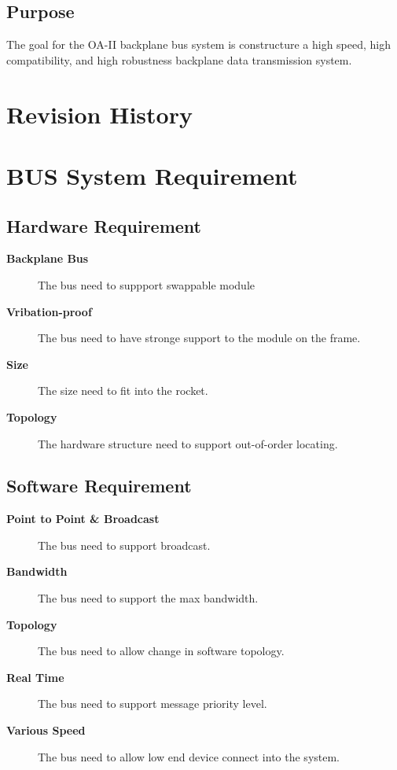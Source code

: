 \documentclass[12pt,article]{memoir}
\begin{document}
\section{Purpose}
The goal for the OA-II backplane bus system is constructure a high speed, high compatibility, and high robustness backplane data transmission system.
\chapter{Revision History}
\begin{table}[H]
	\centering
	\caption{Summary of Revision History}
	\label{tab:rev}
\end{table}
\newpage
\chapter{BUS System Requirement}
\section{Hardware Requirement}
\begin{description}
	\item[\textbf{Backplane Bus}]The bus need to suppport swappable module
	\item[\textbf{Vribation-proof}]The bus need to have stronge support to the module on the frame.
	\item[\textbf{Size}]The size need to fit into the rocket.
	\item[\textbf{Topology}]The hardware structure need to support out-of-order locating.
\end{description}
\section{Software Requirement}
\begin{description}
	\item[\textbf{Point to Point \& Broadcast}]The bus need to support broadcast.
	\item[\textbf{Bandwidth}]The bus need to support the max bandwidth.
	\item[\textbf{Topology}]The bus need to allow change in software topology.
	\item[\textbf{Real Time}]The bus need to support message priority level.
	\item[\textbf{Various Speed}]The bus need to allow low end device connect into the system.
\end{description}
\end{document}
